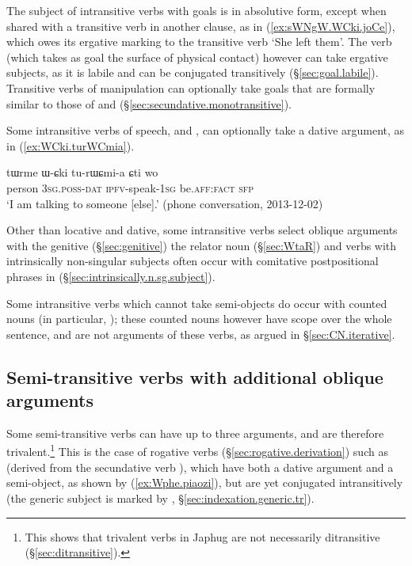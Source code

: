 The subject of intransitive verbs with goals is in absolutive form, except when shared with a transitive verb in another clause, as  in (\ref{ex:sWNgW.WCki.joCe}), which owes its ergative marking to the transitive verb  `She left them'. The verb  (which takes as goal the surface of physical contact) however can take ergative subjects, as it is labile and can be conjugated transitively (§\ref{sec:goal.labile}). Transitive verbs of manipulation can optionally take goals that are formally similar to those of  and  (§\ref{sec:secundative.monotransitive}).

Some intransitive verbs of speech,  and , can optionally take a dative argument, as in (\ref{ex:WCki.turWCmia}).

\begin{exe}
\ex   \label{ex:WCki.turWCmia}
 \gll tɯrme ɯ-ɕki tu-rɯɕmi-a ɕti wo \\
 person \textsc{3sg}.\textsc{poss}-\textsc{dat} \textsc{ipfv}-speak-\textsc{1sg} be.\textsc{aff}:\textsc{fact} \textsc{sfp} \\
\glt `I am talking to someone [else].' (phone conversation, 2013-12-02)
\end{exe}

Other than locative and dative, some intransitive verbs select oblique arguments with the genitive (§\ref{sec:genitive}) the relator noun  (§\ref{sec:WtaR}) and verbs with intrinsically non-singular subjects often occur with comitative postpositional phrases in  (§\ref{sec:intrinsically.n.sg.subject}).

Some intransitive verbs which cannot take semi-objects do occur with counted nouns (in particular, ); these counted nouns however have scope over the whole sentence, and are not arguments of these verbs, as argued in §\ref{sec:CN.iterative}. 

\subsection{Semi-transitive verbs with additional oblique arguments} \label{sec:semi.transitive.dative}
Some semi-transitive verbs can have up to three arguments, and are therefore trivalent.\footnote{
This shows that trivalent verbs in Japhug are not necessarily ditransitive (§\ref{sec:ditransitive}).
} This is the case of rogative verbs (§\ref{sec:rogative.derivation}) such as  (derived from the secundative verb ), which have both a dative argument and a semi-object, as shown by (\ref{ex:Wphe.piaozi}), but are yet conjugated intransitively (the generic subject is marked by , §\ref{sec:indexation.generic.tr}).

